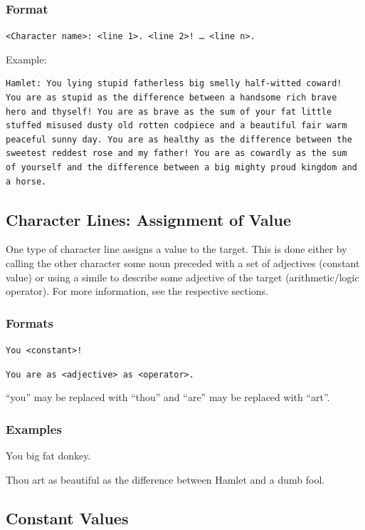 \documentclass[11pt]{article}
\begin{document}
\subsubsection{Format}
\verb|<Character name>: <line 1>. <line 2>! … <line n>.|

Example:
\begin{verbatim}
Hamlet: You lying stupid fatherless big smelly half-witted coward!
You are as stupid as the difference between a handsome rich brave
hero and thyself! You are as brave as the sum of your fat little
stuffed misused dusty old rotten codpiece and a beautiful fair warm
peaceful sunny day. You are as healthy as the difference between the
sweetest reddest rose and my father! You are as cowardly as the sum
of yourself and the difference between a big mighty proud kingdom and a horse.
\end{verbatim}

\subsection{Character Lines: Assignment of Value}

One type of character line assigns a value to the target. This is done either by calling the other character some noun preceded with a set of adjectives (constant value) or using a simile to describe some adjective of the target (arithmetic/logic operator). For more information, see the respective sections.

\subsubsection{Formats}

\verb|You <constant>!|

\verb|You are as <adjective> as <operator>.|

“you” may be replaced with “thou” and “are” may be replaced with “art”.

\subsubsection{Examples}

You big fat donkey.

Thou art as beautiful as the difference between Hamlet and a dumb fool.

\subsection{Constant Values}
\end{document}
